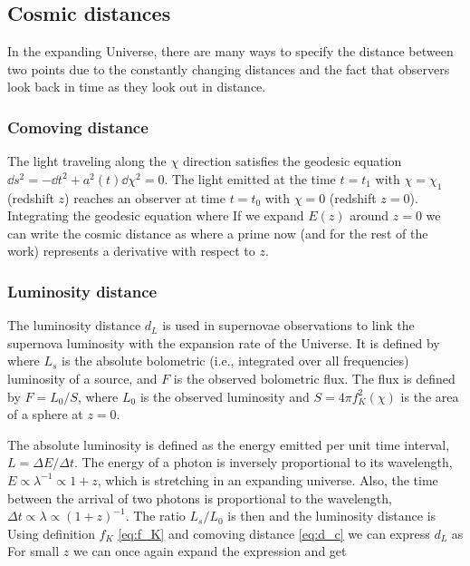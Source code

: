\subsection{Cosmic distances}
In the expanding Universe, there are many ways to specify the distance between two points due to the constantly changing distances and the fact that observers look back in time as they look out in distance.
\subsubsection{Comoving distance}
The light traveling along the $\chi$ direction satisfies the geodesic equation $\dd s^2=-\dd t^2+a^2(t)\dd \chi^2=0$. The light emitted at the time $t=t_1$ with $\chi=\chi_1$ (redshift $z$) reaches an observer at time $t=t_0$ with $\chi=0$ (redshift $z=0$). Integrating the geodesic equation
where
If we expand $E(z)$ around $z=0$ we can write the cosmic distance as
where a prime now (and for the rest of the work) represents a derivative with respect to $z$.
\subsubsection{Luminosity distance}
The luminosity distance $d_L$ is used in supernovae observations to link the supernova luminosity with the expansion rate of the Universe. It is defined by
where $L_s$ is the absolute bolometric (i.e., integrated over all frequencies) luminosity of a source, and $F$ is the observed bolometric flux. The flux is defined by $F=L_0/S$, where $L_0$ is the observed luminosity and $S=4\pi f_K^2(\chi)$ is the area of a sphere at $z=0$.

The absolute luminosity is defined as the energy emitted per unit time interval, $L=\Delta E/\Delta t$. The energy of a photon is inversely proportional to its wavelength, $E\propto\lambda^{-1}\propto 1+z$, which is stretching in an expanding universe. Also, the time between the arrival of two photons is proportional to the wavelength, $\Delta t\propto\lambda\propto(1+z)^{-1}$. The ratio $L_s/L_0$ is then
and the luminosity distance is
Using definition \(f_K\) \eqref{eq:f_K} and comoving distance \eqref{eq:d_c} we can express $d_L$ as
For small $z$ we can once again expand the expression and get
